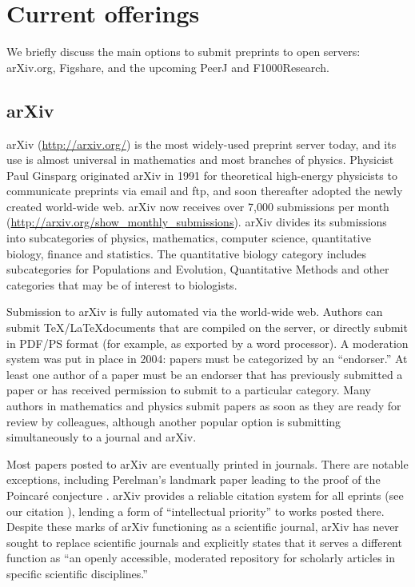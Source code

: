 \documentclass[letterpaper,twocolumn,superscriptaddress,showkeys]{revtex4}
\begin{document}
\section{Current offerings}

We briefly discuss the main options to submit preprints to open servers:
arXiv.org, Figshare, and the upcoming PeerJ and F1000Research.

\subsection{arXiv}

arXiv (\url{http://arxiv.org/}) is the most widely-used preprint server today,
and its use is almost universal in mathematics and most branches of physics.
Physicist Paul Ginsparg originated arXiv in 1991 for theoretical high-energy
physicists to communicate preprints via email and ftp, and soon thereafter
adopted the newly created world-wide web\cite{jackson2002preprints}.  arXiv now
receives over 7,000 submissions per month
(\url{http://arxiv.org/show_monthly_submissions}).  arXiv divides its
submissions into subcategories of physics, mathematics, computer science,
quantitative biology, finance and statistics.  The quantitative biology category
includes subcategories for Populations and Evolution, Quantitative Methods and
other categories that may be of interest to biologists.

Submission to arXiv is fully automated via the world-wide web.  Authors can
submit \TeX/\LaTeX documents that are compiled on the server, or directly submit
in PDF/PS format (for example, as exported by a word processor).  A moderation
system was put in place in 2004: papers must be categorized by an ``endorser.''
At least one author of a paper must be an endorser that has previously submitted
a paper or has received permission to submit to a particular category.  Many
authors in mathematics and physics submit papers as soon as they are ready for
review by colleagues, although another popular option is submitting
simultaneously to a journal and arXiv.

Most papers posted to arXiv are eventually printed in journals.  There are
notable exceptions, including Perelman's landmark paper leading to the proof of
the Poincar\'{e} conjecture \cite{2002math.....11159P}.  arXiv provides a
reliable citation system for all eprints (see our citation
\cite{2002math.....11159P}), lending a form of ``intellectual priority'' to
works posted there.  Despite these marks of arXiv functioning as a scientific
journal, arXiv has never sought to replace scientific journals and explicitly
states that it serves a different function as ``an openly accessible, moderated
repository for scholarly articles in specific scientific disciplines.''
\end{document}
